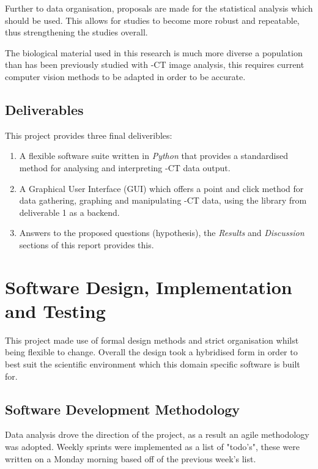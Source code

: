 \documentclass[11pt]{report}
\begin{document}
Further to data organisation, proposals are made for the statistical analysis which should be used. This allows for studies to become more robust and repeatable, thus strengthening the studies overall.

The biological material used in this research is much more diverse a population than has been previously studied with \textmu{}-CT image analysis, this requires current computer vision methods to be adapted in order to be accurate.

\section{Deliverables}
\label{sec-1-7}

This project provides three final deliveribles:

\begin{enumerate}
\item A flexible software suite written in \emph{Python} that provides a standardised method for analysing and interpreting \textmu{}-CT data output.
\item A Graphical User Interface (GUI) which offers a point and click method for data gathering, graphing and manipulating \textmu{}-CT data, using the library from deliverable 1 as a backend.
\item Answers to the proposed questions (hypothesis), the \emph{Results} and \emph{Discussion} sections of this report provides this.
\end{enumerate}

\chapter{Software Design, Implementation and Testing}
\label{sec-2}
This project made use of formal design methods and strict organisation whilst being flexible to change.
Overall the design took a hybridised form in order to best suit the scientific environment which this
domain specific software is built for.

\section{Software Development Methodology}
\label{sec-2-1}
Data analysis drove the direction of the project, as a result an agile methodology was adopted.
Weekly sprints were implemented as a list of "todo's", these were written on a Monday morning based off of the
previous week's list.
\end{document}
